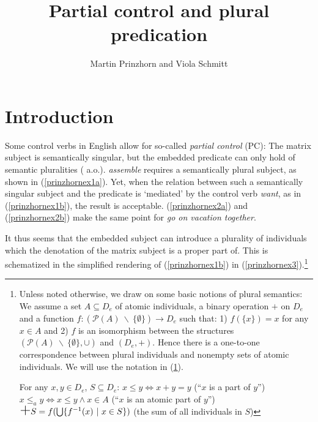 \documentclass[output=paper,colorlinks,citecolor=brown,
]{langscibook}
\author{Martin Prinzhorn\affiliation{University of Vienna} and Viola Schmitt\affiliation{Humboldt University Berlin}\orcid{}}
\title{Partial control and plural predication}
\newcommand{\bigplus}{\ensuremath{\mbox{\LARGE+}}}
\begin{document}
\maketitle

\section{Introduction}\label{prinzhornsec:1}



Some control verbs in English allow for so-called  {\it partial control} (PC): The matrix subject is semantically singular, but the embedded predicate can only hold of semantic pluralities (\cite{Wilkinson:1971, Landau:2000, Wurmbrand:2001, Wurmbrand:2002, Pearson:2016} a.o.). {\it assemble} requires a semantically plural subject, as shown in (\ref{prinzhornex1a}). Yet, when the relation between such a semantically singular subject and the predicate is `mediated' by the control verb {\it want}, as in (\ref{prinzhornex1b}), the result is acceptable. (\ref{prinzhornex2a}) and (\ref{prinzhornex2b}) make the same point for {\it go on vacation together}.

\ea  
{} \label{prinzhornex1a}
 \hfill \cite[(1a)]{Pearson:2016} \label{prinzhornex1b}
 \label{prinzhornex2a}
 \hfill \cite[(1a)]{Pearson:2016} \label{prinzhornex2b}
\z\z
	
It thus seems that the embedded subject can introduce a plurality of individuals which the denotation of the matrix subject is a proper part of. This is schematized in the simplified rendering of (\ref{prinzhornex1b}) in (\ref{prinzhornex3}).\footnote{Unless noted otherwise, we draw on some basic notions of plural semantics: We assume a set $A \subseteq D_e$ of atomic individuals, a binary operation $+$ on $D_e$ and a function $f: (\mathcal{P}(A)\ \backslash\ \{\emptyset\}) \to D_e$ such that: 1) $f(\{x\}) = x$ for any $x \in A$ and 2) $f$ is an isomorphism between the structures $(\mathcal{P}(A)\ \backslash\ \{\emptyset\}, \cup)$ and $(D_e, +)$. Hence there is a one-to-one correspondence between plural individuals and nonempty sets of atomic individuals. We will use the notation in (\ref{prinzhornDD}).

\ea \label{prinzhornDD} For any $x, y \in D_e$, $S \subseteq D_e$:
\ea $x \leq y \Leftrightarrow x + y = y$ (``$x$ is a part of $y$'')
 \ex $x \leq_{a} y \Leftrightarrow x \leq y \land x \in A$ (``$x$ is an atomic part of $y$'')
\ex  $\bigplus S = f(\bigcup\{f^{-1}(x)\ |\ x \in S\})$ (the sum of all individuals in $S$)
\z\z




}
\end{document}

